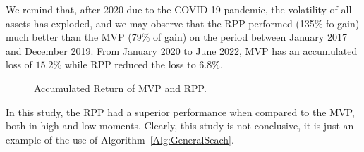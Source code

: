 We remind that, after 2020 due to the COVID-19 pandemic, the volatility of all assets has exploded, and we may observe that the RPP performed (135\% fo gain) much better than the MVP (79\% of gain) on the period between January 2017 and December 2019. From January 2020 to June 2022, MVP has an accumulated loss of $15.2\%$ while RPP reduced the loss to $6.8\%$.

\begin{figure}[H]
	\begin{subfigmatrix}{2}
	\end{subfigmatrix}
	\caption{Accumulated Return of MVP and RPP.}
	\label{fig:retornoRPPMVP12}
\end{figure}

In this study, the RPP had a superior performance when compared to the MVP, both in high and low moments. Clearly, this study is not conclusive, it is just an example of the use of Algorithm~\ref{Alg:GeneralSeach}.



